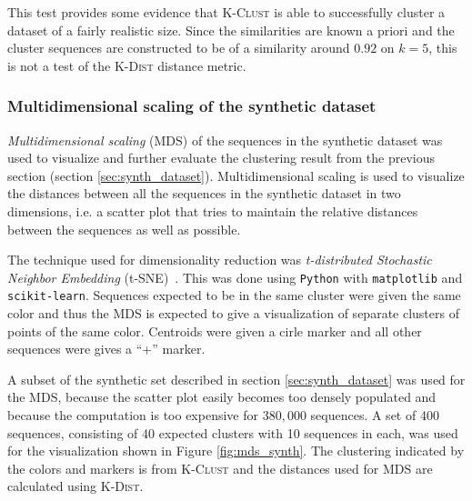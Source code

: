 This test provides some evidence that \textsc{K-Clust} is able to successfully
cluster a dataset of a fairly realistic size. Since the similarities are known
a priori and the cluster sequences are constructed to be of a similarity around
$0.92$ on $k=5$, this is not a test of the \textsc{K-Dist} distance metric.


\subsubsection{Multidimensional scaling of the synthetic dataset}
\label{sec:mds_synth}

\emph{Multidimensional scaling} (MDS) of the sequences in the synthetic dataset
was used to visualize and further evaluate the clustering result from the
previous section (section \ref{sec:synth_dataset}). Multidimensional scaling is
used to visualize the distances between all the sequences in the synthetic
dataset in two dimensions, i.e. a scatter plot that tries to maintain the
relative distances between the sequences as well as possible.

The technique used for dimensionality reduction was \emph{t-distributed
Stochastic Neighbor Embedding} (t-SNE)~\cite{maaten}. This was done using
\texttt{Python} with \texttt{matplotlib} and \texttt{scikit-learn}. Sequences
expected to be in the same cluster were given the same color and thus the MDS
is expected to give a visualization of separate clusters of points of the same
color. Centroids were given a cirle marker and all other sequences were gives a
``+'' marker.

A subset of the synthetic set described in section \ref{sec:synth_dataset} was
used for the MDS, because the scatter plot easily becomes too densely populated
and because the computation is too expensive for $380,000$ sequences. A set of
400 sequences, consisting of 40 expected clusters with 10 sequences in each,
was used for the visualization shown in Figure \ref{fig:mds_synth}. The
clustering indicated by the colors and markers is from \textsc{K-Clust} and the
distances used for MDS are calculated using \textsc{K-Dist}.

